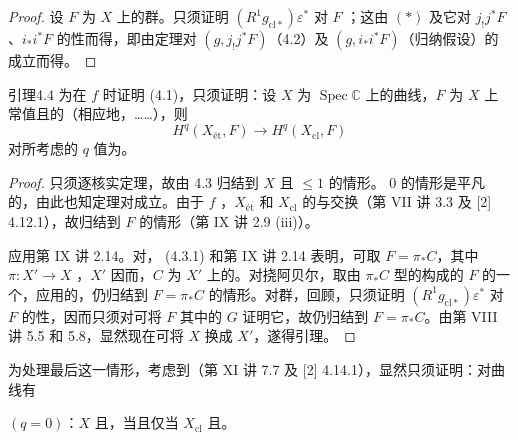 \begin{proof}
设 $F$ 为 $X$ 上的群。只须证明 $(R^1g_{\mathrm{cl}*})\varepsilon^*$ 对 $F$ ；这由 $(*)$ 及它对 $j_!j^*F$、$i_*i^*F$ 的性而得，即由定理对 $(g,j_!j^*F)$（4.2）及 $(g,i_*i^*F)$（归纳假设）的成立而得。
\end{proof}
\begin{SGAresult}{引理}{4.4}
为在 $f$ 时证明 (4.1)，只须证明：设 $X$ 为 $\operatorname{Spec}\mathbb C$ 上的曲线，$F$ 为 $X$ 上常值且的（相应地，……），则
\[
H^q(X_{\text{ét}},F)\longrightarrow H^q(X_{\mathrm{cl}},F)
\]
对所考虑的 $q$ 值为。
\end{SGAresult}
\begin{proof}
只须逐核实定理，故由 4.3 归结到 $X$ 且 $\leq1$ 的情形。 $0$ 的情形是平凡的，由此也知定理对成立。由于 $f$ ，$X_{\text{ét}}$ 和 $X_{\mathrm{cl}}$ 的与交换（第 VII 讲 3.3 及 [2] 4.12.1），故归结到 $F$ 的情形（第 IX 讲 2.9 (iii)）。

应用第 IX 讲 2.14。对， (4.3.1) 和第 IX 讲 2.14 表明，可取 $F=\pi_*C$，其中 $\pi:X'\to X$ ，$X'$ 因而，$C$ 为 $X'$ 上的。对挠阿贝尔，取由 $\pi_*C$ 型的构成的 $F$ 的一个，应用的，仍归结到 $F=\pi_*C$ 的情形。对群，回顾，只须证明 $(R^1g_{\mathrm{cl}*})\varepsilon^*$ 对 $F$ 的性，因而只须对可将 $F$ 其中的 $G$ 证明它，故仍归结到 $F=\pi_*C$。由第 VIII 讲 5.5 和 5.8，显然现在可将 $X$ 换成 $X'$，遂得引理。
\end{proof}
为处理最后这一情形，考虑到（第 XI 讲 7.7 及 [2] 4.14.1），显然只须证明：对曲线有

$(q=0)$：$X$ 且，当且仅当 $X_{\mathrm{cl}}$ 且。

